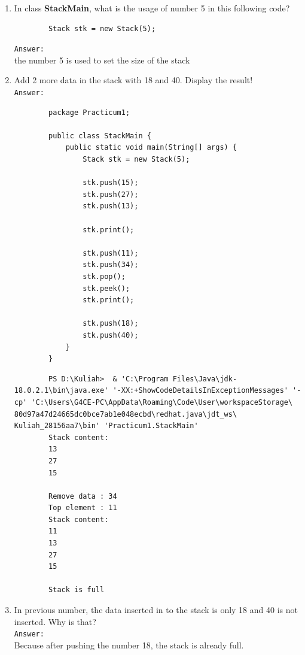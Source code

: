 \documentclass[12pt,titlepage]{article}
\begin{document}
\begin{enumerate}
    \item In class \textbf{StackMain}, what is the usage of number 5 in this following code?
    \begin{verbatim}
        Stack stk = new Stack(5);
    \end{verbatim}
    \texttt{Answer: }
    \mbox{}\\
    the number 5 is used to set the size of the stack
    \item Add 2 more data in the stack with 18 and 40. Display the result!
    \mbox{}\\
    \texttt{Answer: }
    \begin{verbatim}
        package Practicum1;

        public class StackMain {
            public static void main(String[] args) {
                Stack stk = new Stack(5);

                stk.push(15);
                stk.push(27);
                stk.push(13);

                stk.print();

                stk.push(11);
                stk.push(34);
                stk.pop();
                stk.peek();
                stk.print();

                stk.push(18);
                stk.push(40);
            }
        }
    \end{verbatim}
    \begin{verbatim}
        PS D:\Kuliah>  & 'C:\Program Files\Java\jdk-18.0.2.1\bin\java.exe' '-XX:+ShowCodeDetailsInExceptionMessages' '-cp' 'C:\Users\G4CE-PC\AppData\Roaming\Code\User\workspaceStorage\ 80d97a47d24665dc0bce7ab1e048ecbd\redhat.java\jdt_ws\ Kuliah_28156aa7\bin' 'Practicum1.StackMain'
        Stack content: 
        13 
        27
        15

        Remove data : 34
        Top element : 11
        Stack content:
        11
        13
        27
        15

        Stack is full
    \end{verbatim}
    \item In previous number, the data inserted in to the stack is only 18 and 40 is not inserted. Why is that?
    \mbox{}\\
    \texttt{Answer: }
    \mbox{}\\
    Because after pushing the number 18, the stack is already full.
\end{enumerate}
\end{document}
